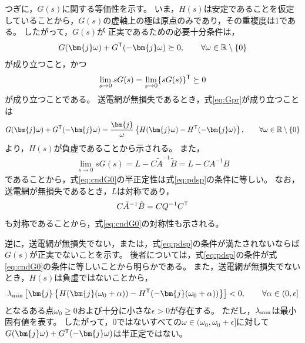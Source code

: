 \documentclass[tombow,dvipdfmx]{corona-a5}
\begin{document}
\begin{証明}
つぎに，$G(s)$に関する等価性を示す。
いま，$H(s)$は安定であることを仮定していることから，$G(s)$の虚軸上の極は原点のみであり，その重複度は1である。
したがって，$G(s)$が
正実であるための必要十分条件は，
\begin{align}\label{eq:Gpr}
G(\bm{j}\omega) + G^{\sf T}(-\bm{j}\omega) \succeq 0
,\qquad \forall \omega \in \mathbb{R}\setminus\{0\}
\end{align}
が成り立つこと，かつ
\begin{align}\label{eq:cndG0}
\lim_{s\rightarrow 0} s G(s) = \lim_{s\rightarrow 0} \{ s G(s)\}^{\sf T}\succeq 0
\end{align}
が成り立つことである。
送電網が無損失であるとき，式\ref{eq:Gpr}が成り立つことは
\begin{align}\label{eq:NIineq}
G(\bm{j}\omega) + G^{\sf T}(-\bm{j}\omega)
=
\frac{\bm{j}}{\omega} \left\{
H(\bm{j}\omega) - H^{\sf T}(-\bm{j}\omega)
\right\}
,\qquad \forall \omega \in \mathbb{R}\setminus\{0\}
\end{align}
より，$H(s)$が負虚であることから示される。
また，
\begin{align*}
\lim_{s\rightarrow 0} s G(s) =
L - C\tilde{A}^{-1}\tilde{B} = L - C A^{-1} B
\end{align*}
であることから，式\ref{eq:cndG0}の半正定性は式\ref{eq:pdsp}の条件に等しい。
なお，送電網が無損失であるとき，$L$は対称であり，
\begin{align*}
C\tilde{A}^{-1}\tilde{B} = C Q^{-1} C^{\sf T}
\end{align*}
も対称であることから，式\ref{eq:cndG0}の対称性も示される。

逆に，送電網が無損失でない，または，式\ref{eq:pdsp}の条件が満たされないならば$G(s)$が正実でないことを示す。
後者については，式\ref{eq:pdsp}の条件が式\ref{eq:cndG0}の条件に等しいことから明らかである。
また，送電網が無損失でないとき，$H(s)$は負虚ではないことから，
\begin{align*}
\lambda_{\rm min}\left[
\bm{j}
\left\{
H(\bm{j}(\omega_0 + \alpha )) - H^{\sf T}(-\bm{j}(\omega_0 + \alpha ))
\right\}
\right] < 0
,\qquad
\forall \alpha \in (0,\epsilon] 
\end{align*}
となるある点$\omega_0\geq 0$および十分に小さな$\epsilon >0$が存在する。
ただし，$\lambda_{\rm min}$は最小固有値を表す。
したがって，0ではないすべての$\omega \in (\omega_0, \omega_0+\epsilon] $に対して
$G(\bm{j} \omega) + G^{\sf T}(-\bm{j} \omega) $は半正定ではない。
\end{証明}
\end{document}

